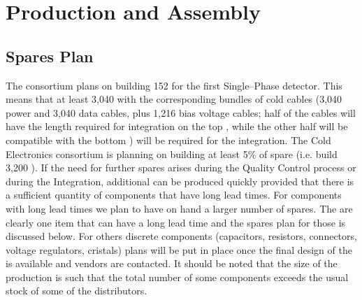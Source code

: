 \section{Production and Assembly}
\label{sec:fdsp-tpcelec-production}

\subsection{Spares Plan}
\label{sec:fdsp-tpcelec-production-spares}

The  consortium plans on building 152 
for the first Single--Phase detector. This means that at least
3,040  with the corresponding bundles of cold
cables (3,040 power and 3,040 data cables, plus 1,216 bias voltage
cables; half of the cables will have the length required for 
integration on the top , while the other half will
be compatible with the bottom ) will be required for 
the integration. The Cold Electronics consortium is planning on
building at least 5\% of spare  (i.e. build 3,200
). If the need for further spares arises during the
Quality Control process or during the Integration, additional 
 can be produced quickly provided that there is
a sufficient quantity of components that have long lead times.
For components with long lead times we plan to have on hand a
larger number of spares. The  are clearly one item
that can have a long lead time and the spares plan for those is
discussed below. For others discrete components
(capacitors, resistors, connectors, voltage regulators, cristals)
plans will be put in place once the final design of the 
is available and vendors are contacted. It should be noted that the
size of the  production is such that the total number
of some components exceeds the usual stock of some of the distributors.

